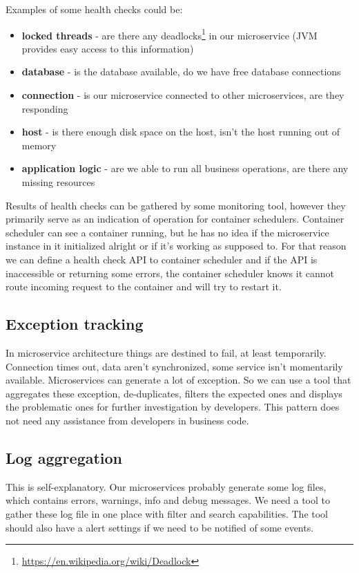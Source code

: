 \documentclass[12pt,oneside]{fithesis2}
\begin{document}
Examples of some health checks could be:
\begin{itemize}
\item \textbf{locked threads} - are there any deadlocks\footnote{\url{https://en.wikipedia.org/wiki/Deadlock}} in our microservice (JVM provides easy access to this information)
\item \textbf{database} - is the database available, do we have free database connections
\item \textbf{connection} - is our microservice connected to other microservices, are they responding
\item \textbf{host} - is there enough disk space on the host, isn't the host running out of memory
\item \textbf{application logic} - are we able to run all business operations, are there any missing resources
\end{itemize}

Results of health checks can be gathered by some monitoring tool, however they primarily serve as an indication of operation for container schedulers. Container scheduler can see a container running, but he has no idea if the microservice instance in it initialized alright or if it's working as supposed to. For that reason we can define a health check API to container scheduler and if the API is inaccessible or returning some errors, the container scheduler knows it cannot route incoming request to the container and will try to restart it.

\subsection{Exception tracking}
In microservice architecture things are destined to fail, at least temporarily. Connection times out, data aren't synchronized, some service isn't momentarily available. Microservices can generate a lot of exception. So we can use a tool that aggregates these exception, de-duplicates, filters the expected ones and displays the problematic ones for further investigation by developers. This pattern does not need any assistance from developers in business code.

\subsection{Log aggregation}
This is self-explanatory. Our microservices probably generate some log files, which contains errors, warnings, info and debug messages. We need a tool to gather these log file in one place with filter and search capabilities. The tool should also have a alert settings if we need to be notified of some events.
\end{document}
